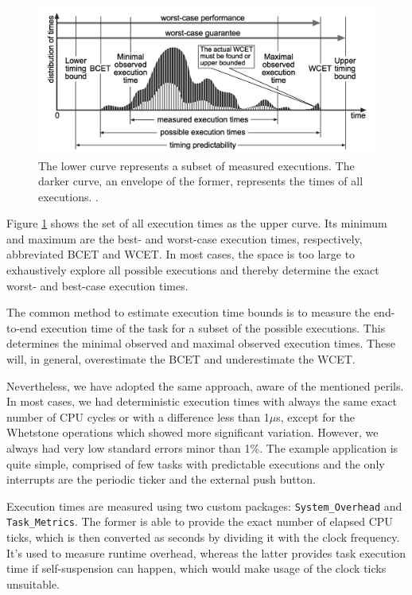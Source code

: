 \documentclass{article}
\begin{document}
\begin{figure}[!htbp]
\centering
\includegraphics[width=5in]{images/wcet}
\caption{The lower curve represents a subset of measured executions. The darker curve, an envelope of the former, represents the times of all executions. \cite{wcet-problem}.}
\label{wcet-curve}
\end{figure}

Figure \ref{wcet-curve} shows the set of all execution times as the upper curve. Its minimum and maximum are the best- and worst-case execution times, respectively, abbreviated BCET and WCET. In most cases, the space is too large to exhaustively explore all possible executions and thereby determine the exact worst- and best-case execution times.

The common method to estimate execution time bounds is to measure the end-to-end execution time of the task for a subset of the possible executions. This determines the minimal observed and maximal observed execution times. These will, in general, overestimate the BCET and underestimate the WCET.

Nevertheless, we have adopted the same approach, aware of the mentioned perils. In most cases, we had deterministic execution times with always the same exact number of CPU cycles or with a difference less than 1$\mu$s, except for the Whetstone operations which showed more significant variation. However, we always had very low standard errors minor than 1\%. The example application is quite simple, comprised of few tasks with predictable executions and the only interrupts are the periodic ticker and the external push button.

Execution times are measured using two custom packages: \texttt{System\_Overhead} and \texttt{Task\_Metrics}. The former is able to provide the exact number of elapsed CPU ticks, which is then converted as seconds by dividing it with the clock frequency. It's used to measure runtime overhead, whereas the latter provides task execution time if self-suspension can happen, which would make usage of the clock ticks unsuitable.
\end{document}
